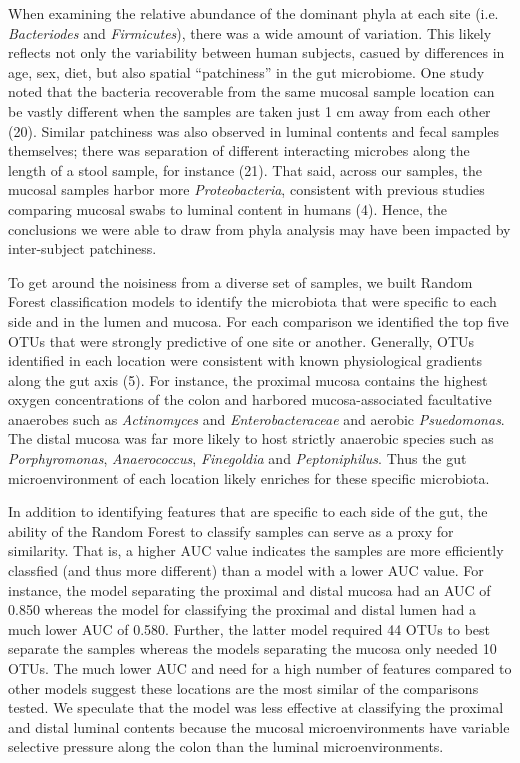 \documentclass[12pt,]{article}
\begin{document}
When examining the relative abundance of the dominant phyla at each site
(i.e. \emph{Bacteriodes} and \emph{Firmicutes}), there was a wide amount
of variation. This likely reflects not only the variability between
human subjects, casued by differences in age, sex, diet, but also
spatial ``patchiness'' in the gut microbiome. One study noted that the
bacteria recoverable from the same mucosal sample location can be vastly
different when the samples are taken just 1 cm away from each other
(20). Similar patchiness was also observed in luminal contents and fecal
samples themselves; there was separation of different interacting
microbes along the length of a stool sample, for instance (21). That
said, across our samples, the mucosal samples harbor more
\emph{Proteobacteria}, consistent with previous studies comparing
mucosal swabs to luminal content in humans (4). Hence, the conclusions
we were able to draw from phyla analysis may have been impacted by
inter-subject patchiness.

To get around the noisiness from a diverse set of samples, we built
Random Forest classification models to identify the microbiota that were
specific to each side and in the lumen and mucosa. For each comparison
we identified the top five OTUs that were strongly predictive of one
site or another. Generally, OTUs identified in each location were
consistent with known physiological gradients along the gut axis (5).
For instance, the proximal mucosa contains the highest oxygen
concentrations of the colon and harbored mucosa-associated facultative
anaerobes such as \emph{Actinomyces} and \emph{Enterobacteraceae} and
aerobic \emph{Psuedomonas}. The distal mucosa was far more likely to
host strictly anaerobic species such as \emph{Porphyromonas},
\emph{Anaerococcus}, \emph{Finegoldia} and \emph{Peptoniphilus}. Thus
the gut microenvironment of each location likely enriches for these
specific microbiota.

In addition to identifying features that are specific to each side of
the gut, the ability of the Random Forest to classify samples can serve
as a proxy for similarity. That is, a higher AUC value indicates the
samples are more efficiently classfied (and thus more different) than a
model with a lower AUC value. For instance, the model separating the
proximal and distal mucosa had an AUC of 0.850 whereas the model for
classifying the proximal and distal lumen had a much lower AUC of 0.580.
Further, the latter model required 44 OTUs to best separate the samples
whereas the models separating the mucosa only needed 10 OTUs. The much
lower AUC and need for a high number of features compared to other
models suggest these locations are the most similar of the comparisons
tested. We speculate that the model was less effective at classifying
the proximal and distal luminal contents because the mucosal
microenvironments have variable selective pressure along the colon than
the luminal microenvironments.
\end{document}
